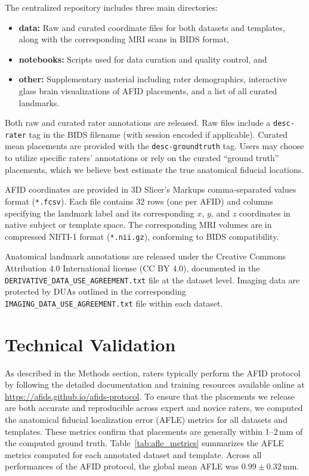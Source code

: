 The centralized repository includes three main directories:
\begin{itemize}
    \item \textbf{data:} Raw and curated coordinate files for both datasets and templates, along with the corresponding MRI scans in BIDS format,
    \item \textbf{notebooks:} Scripts used for data curation and quality control, and
    \item \textbf{other:} Supplementary material including rater demographics, interactive glass brain visualizations of AFID placements, and a list of all curated landmarks.
\end{itemize}

Both raw and curated rater annotations are released. Raw files include a \texttt{desc-rater} tag in the BIDS filename (with session encoded if applicable). Curated mean placements are provided with the \texttt{desc-groundtruth} tag. Users may choose to utilize specific raters’ annotations or rely on the curated “ground truth” placements, which we believe best estimate the true anatomical fiducial locations.

AFID coordinates are provided in 3D Slicer’s Markups comma-separated values format (\texttt{*.fcsv}). Each file contains 32 rows (one per AFID) and columns specifying the landmark label and its corresponding $x$, $y$, and $z$ coordinates in native subject or template space. The corresponding MRI volumes are in compressed NIfTI-1 format (\texttt{*.nii.gz}), conforming to BIDS compatibility.

Anatomical landmark annotations are released under the Creative Commons Attribution 4.0 International license (CC BY 4.0), documented in the \texttt{DERIVATIVE\_DATA\_USE\_AGREEMENT.txt} file at the dataset level. Imaging data are protected by DUAs outlined in the corresponding \texttt{IMAGING\_DATA\_USE\_AGREEMENT.txt} file within each dataset.


\section{Technical Validation}
As described in the Methods section, raters typically perform the AFID protocol by following the detailed documentation and training resources available online at \url{https://afids.github.io/afids-protocol}\cite{afidsprotocol}. To ensure that the placements we release are both accurate and reproducible across expert and novice raters, we computed the anatomical fiducial localization error (AFLE) metrics for all datasets and templates. These metrics confirm that placements are generally within 1–2\,mm of the computed ground truth.  Table~\ref{tab:afle_metrics} summarizes the AFLE metrics computed for each annotated dataset and template. Across all performances of the AFID protocol, the global mean AFLE was $0.99 \pm 0.32$\,mm.


